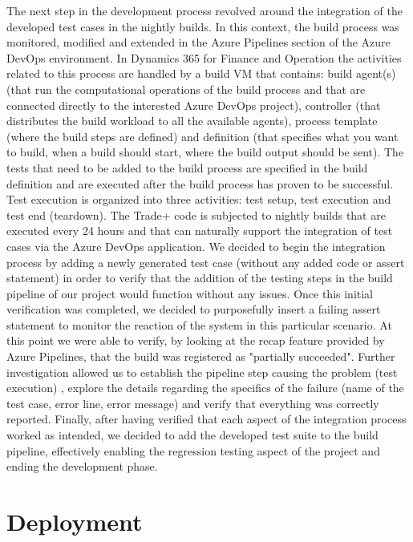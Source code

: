 The next step in the development process revolved around the integration of the developed test cases in the nightly builds. In this context, the build process was monitored, modified and extended in the Azure Pipelines section of the Azure DevOps environment. In Dynamics 365 for Finance and Operation the activities related to this process are handled by a build VM that contains: build agent(s) (that run the computational operations of the build process and that are connected directly to the interested Azure DevOps project), controller (that distributes the build workload to all the available agents), process template (where the build steps are defined) and definition (that specifies what you want to build, when a build should start, where the build output should be sent). The tests that need to be added to the build process are specified in the build definition and are executed after the build process has proven to be successful. Test execution is organized into three activities: test setup, test execution and test end (teardown). The Trade+ code is subjected to nightly builds that are executed every 24 hours and that can naturally support the integration of test cases via the Azure DevOps application. We decided to begin the integration process by adding a newly generated test case (without any added code or assert statement) in order to verify that the addition of the testing steps in the build pipeline of our project would function without any issues. Once this initial verification was completed, we decided to purposefully insert a failing assert statement to monitor the reaction of the system in this particular scenario. At this point we were able to verify, by looking at the recap feature provided by Azure Pipelines, that the build was registered as "partially succeeded". Further investigation allowed us to establish the pipeline step causing the problem (test execution) , explore the details regarding the specifics of the failure (name of the test case, error line, error message) and verify that everything was correctly reported. Finally, after having verified that each aspect of the integration process worked as intended, we decided to add the developed test suite to the build pipeline, effectively enabling the regression testing aspect of the project and ending the development phase.

\section{Deployment}

